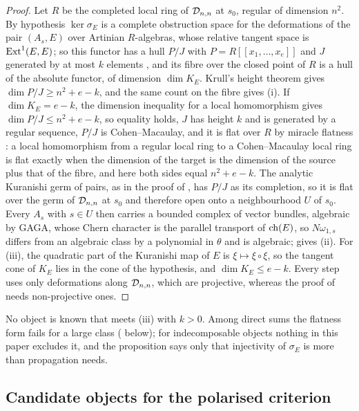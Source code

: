 \begin{proof}
Let $R$ be the completed local ring of $\mathcal{D}_{n,n}$ at $s_{0}$, regular of
dimension $n^{2}$. By hypothesis $\ker\sigma_{E}$ is a complete obstruction
space for the deformations of the pair $(A_{s},E)$ over Artinian $R$-algebras,
whose relative tangent space is $\operatorname{Ext}^{1}(E,E)$; so this functor has a hull
$P/J$ with $P=R[[x_{1},\dots,x_{e}]]$ and $J$ generated by at most $k$
elements \cite{FM98}, and its fibre over the closed point of $R$ is a hull of
the absolute functor, of dimension $\dim K_{E}$. Krull's height theorem gives
$\dim P/J\ge n^{2}+e-k$, and the same count on the fibre gives (i). If
$\dim K_{E}=e-k$, the dimension inequality for a local homomorphism
\cite[Theorem~15.1]{Mat86} gives $\dim P/J\le n^{2}+e-k$, so equality holds, $J$
has height $k$ and is generated by a regular sequence, $P/J$ is
Cohen--Macaulay, and it is flat over $R$ by miracle flatness
\cite[Theorem~23.1]{Mat86}: a local homomorphism from a regular local ring to
a Cohen--Macaulay local ring is flat exactly when the dimension of the target
is the dimension of the source plus that of the fibre, and here both sides
equal $n^{2}+e-k$. The analytic Kuranishi germ of pairs, as in the
proof of , has $P/J$ as its completion, so it is flat over
the germ of $\mathcal{D}_{n,n}$ at $s_{0}$ and therefore open onto a neighbourhood
$U$ of $s_{0}$. Every $A_{s}$ with $s\in U$ then carries a bounded complex of
vector bundles, algebraic by GAGA, whose Chern character is the parallel
transport of $\operatorname{ch}(E)$, so $N\omega_{1,s}$ differs from an algebraic class by a
polynomial in $\theta$ and is algebraic; \cite[Corollary~16.5]{paperI} gives (ii).
For (iii), the quadratic part of the Kuranishi map of $E$ is
$\xi\mapsto\xi\circ\xi$, so the tangent cone of $K_{E}$ lies in the cone of the
hypothesis, and $\dim K_{E}\le e-k$. Every step uses only deformations along
$\mathcal{D}_{n,n}$, which are projective, whereas the proof of 
needs non-projective ones.
\end{proof}

No object is known that meets (iii) with $k>0$. Among direct sums the
flatness form fails for a large class ( below); for
indecomposable objects nothing in this paper excludes it, and the proposition
says only that injectivity of $\sigma_{E}$ is more than propagation needs.

\subsection{Candidate objects for the polarised criterion}

